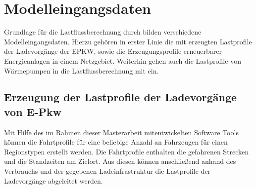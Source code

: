 
\section{Modelleingangsdaten}

Grundlage für die Lastflussberechnung durch \edisgo bilden verschiedene Modelleingangsdaten.
Hierzu gehören in erster Linie die mit \simbev erzeugten Lastprofile der Ladevorgänge der \gls{EPKW}, sowie die Erzeugungsprofile erneuerbarer Energieanlagen in einem Netzgebiet.
Weiterhin gehen auch die Lastprofile von Wärmepumpen in die Lastflussberechnung mit ein.

\subsection{Erzeugung der Lastprofile der Ladevorgänge von E-Pkw}

Mit Hilfe des im Rahmen dieser Masterarbeit mitentwickelten Software Tools \simbev können die Fahrtprofile für eine beliebige Anzahl an Fahrzeugen für einen Regionstypen erstellt werden.
Die Fahrtprofile enthalten die gefahrenen Strecken und die Standzeiten am Zielort.
Aus diesen können anschließend anhand des Verbrauchs und der gegebenen Ladeinfrastruktur die Lastprofile der Ladevorgänge abgeleitet werden.\medskip

